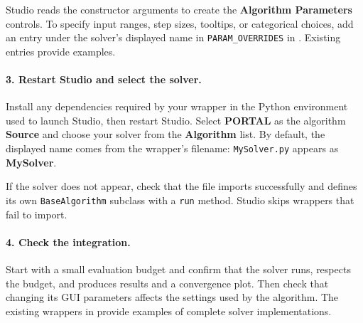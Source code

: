 \documentclass[journal,onecolumn]{IEEEtran}
\begin{document}
Studio reads the constructor arguments to create the \textbf{Algorithm Parameters} controls. To specify input ranges, step sizes, tooltips, or categorical choices, add an entry under the solver's displayed name in \texttt{PARAM\_OVERRIDES} in . Existing entries provide examples.

\paragraph{3. Restart Studio and select the solver.}
Install any dependencies required by your wrapper in the Python environment used to launch Studio, then restart Studio. Select \textbf{PORTAL} as the algorithm \textbf{Source} and choose your solver from the \textbf{Algorithm} list. By default, the displayed name comes from the wrapper's filename: \texttt{MySolver.py} appears as \textbf{MySolver}.

If the solver does not appear, check that the file imports successfully and defines its own \texttt{BaseAlgorithm} subclass with a \texttt{run} method. Studio skips wrappers that fail to import.

\paragraph{4. Check the integration.}
Start with a small evaluation budget and confirm that the solver runs, respects the budget, and produces results and a convergence plot. Then check that changing its GUI parameters affects the settings used by the algorithm. The existing wrappers in  provide examples of complete solver implementations.

\clearpage


\end{document}
